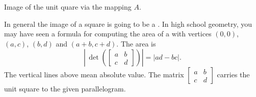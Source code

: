 \documentclass{ximera}
\begin{document}
\begin{myfig}
    \capstart
    
    \caption{Image of the unit quare via the mapping $A$.\label{linalg-imagesquare:fig}}
\end{myfig}

In general the image of a square is going to be a . In high school geometry, you may have seen a formula for computing the area of a  with vertices $(0,0)$, $(a,c)$, $(b,d)$ and $(a+b,c+d)$.  The area is
\begin{equation*}
    \left\lvert \, \det 
    \left(
        \begin{bmatrix} 
            a & b \\ 
            c & d 
        \end{bmatrix}
    \right) 
    \right\lvert
    = \lvert a d - b c \rvert .
\end{equation*}
The vertical lines above mean absolute value. The matrix $\left[ \begin{smallmatrix} a & b \\ c & d \end{smallmatrix} \right]$ carries the unit square to the given parallelogram.
\end{document}
